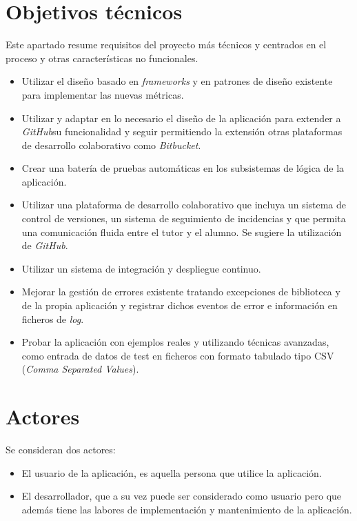 \section{Objetivos técnicos}
Este apartado resume requisitos del proyecto más técnicos y centrados en el proceso y otras características no funcionales.
\begin{itemize}
	\tightlist
	\item Utilizar el diseño basado en \textit{frameworks}  y en patrones de diseño \cite{gamma_patrones_2002} existente para implementar las nuevas métricas.
	\item Utilizar y adaptar en lo necesario el diseño de la aplicación para extender a \textit{GitHub}su funcionalidad y seguir permitiendo la extensión otras plataformas de desarrollo colaborativo como \textit{Bitbucket}.
	\item Crear una batería de pruebas automáticas en los subsistemas de lógica de la aplicación.
	\item Utilizar una plataforma de desarrollo colaborativo que incluya un sistema de control de versiones, un sistema de seguimiento de incidencias y que permita una comunicación fluida entre el tutor y el alumno. Se sugiere la utilización de \textit{GitHub}.
	\item Utilizar un sistema de integración y despliegue continuo.
	\item Mejorar la gestión de errores existente tratando excepciones de biblioteca y de la propia aplicación y registrar dichos eventos de error e información en ficheros de \textit{log}. 
	\item Probar la aplicación con ejemplos reales y utilizando técnicas avanzadas, como entrada de datos de test en ficheros con formato tabulado tipo CSV (\textit{Comma Separated Values}). 	
\end{itemize}

\section{Actores}
Se consideran dos actores:
\begin{itemize}
	\tightlist
	\item El usuario de la aplicación, es aquella persona que utilice la aplicación.
	\item El desarrollador, que a su vez puede ser considerado como usuario pero que además tiene las labores de implementación y mantenimiento de la aplicación.
\end{itemize}

